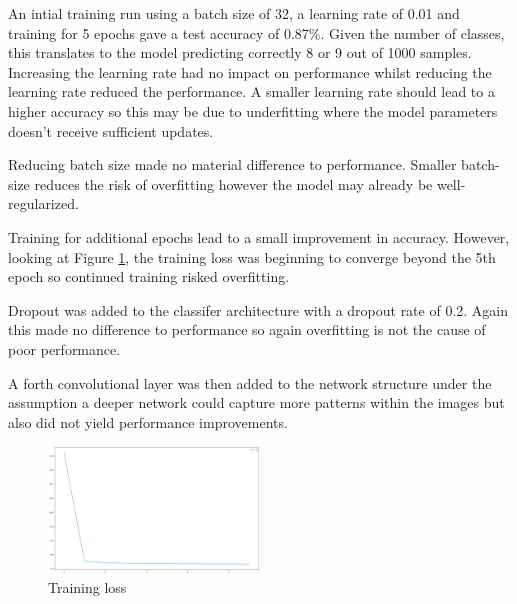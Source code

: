 \documentclass{article}
\begin{document}
An intial training run using a batch size of 32, a learning rate of 0.01 and training for 5 epochs gave a test accuracy of 0.87\%. Given the number of classes, this translates to the model predicting correctly 8 or 9 out of 1000 samples.
Increasing the learning rate had no impact on performance whilst reducing the learning rate reduced the performance. A smaller learning rate should lead to a higher accuracy \cite{smith2018dont} so this may be due to underfitting where the model parameters doesn't receive sufficient updates.


Reducing batch size made no material difference to performance. Smaller batch-size reduces the risk of overfitting however the model may already be well-regularized.

Training for additional epochs lead to a small improvement in accuracy. However, looking at Figure \ref{fig:training_loss}, the training loss was beginning to converge beyond the 5th epoch so continued training risked overfitting.

Dropout was added to the classifer architecture with a dropout rate of 0.2. Again this made no difference to performance so again overfitting is not the cause of poor performance.

A forth convolutional layer was then added to the network structure under the assumption a deeper network could capture more patterns within the images but also did not yield performance improvements. 

\begin{figure}
    \centering
    \includegraphics[width=0.5\textwidth]{train_loss.png}
    \caption{Training loss}
    \label{fig:training_loss}
\end{figure}
\end{document}

